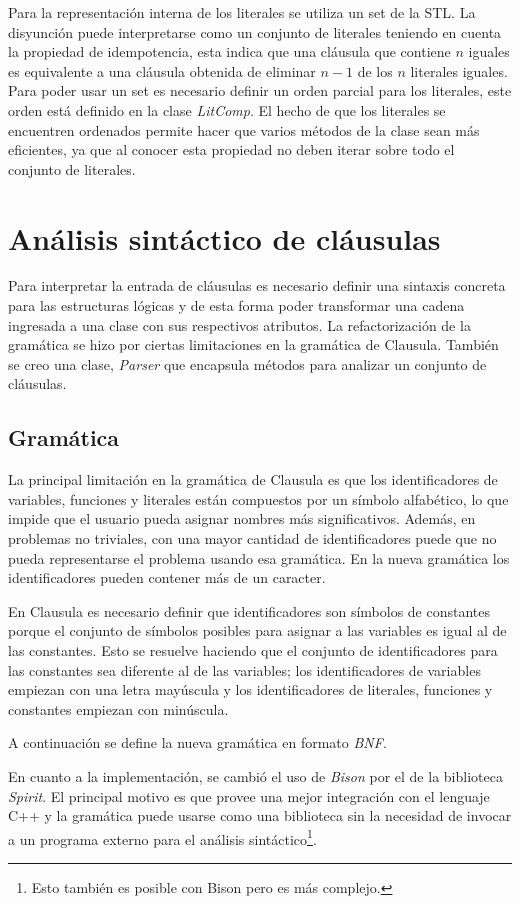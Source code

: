 \documentclass[a4paper,12pt]{article}
\begin{document}
Para la representación interna de los literales se utiliza un set de la STL. La disyunción puede interpretarse como
un conjunto de literales teniendo en cuenta la propiedad de idempotencia, esta indica que una cláusula que contiene
$n$ iguales es equivalente a una cláusula obtenida de eliminar $n-1$ de los $n$ literales iguales. Para poder usar
un set es necesario definir un orden parcial para los literales, este orden está definido en la clase \emph{LitComp}.
El hecho de que los literales se encuentren ordenados permite hacer que varios métodos de la clase sean más eficientes,
ya que al conocer esta propiedad no deben iterar sobre todo el conjunto de literales.
\section{Análisis sintáctico de cláusulas} %
Para interpretar la entrada de cláusulas es necesario definir una sintaxis concreta para las estructuras
lógicas y de esta forma poder transformar una cadena ingresada a una clase con sus respectivos atributos.
La refactorización de la gramática se hizo por ciertas limitaciones en la gramática de Clausula. También
se creo una clase, \emph{Parser} que encapsula métodos para analizar un conjunto de cláusulas.
\subsection{Gramática}
La principal limitación en la gramática de Clausula es que los identificadores de variables, funciones y literales
están compuestos por un símbolo alfabético, lo que impide que el usuario pueda asignar nombres más significativos. Además,
en problemas no triviales, con una mayor cantidad de identificadores puede que no pueda representarse el problema
usando esa gramática. En la nueva gramática los identificadores pueden contener más de un caracter.

En Clausula es necesario definir que identificadores son símbolos de constantes porque el conjunto
de símbolos posibles para asignar a las variables es igual al de las constantes. Esto se resuelve haciendo
que el conjunto de identificadores para las constantes sea diferente al de las variables; los
identificadores de variables empiezan con una letra mayúscula y los identificadores de literales, funciones y constantes
empiezan con minúscula.

A continuación se define la nueva gramática en formato \emph{BNF}.

En cuanto a la implementación, se cambió el uso de \emph{Bison} por el de la biblioteca \emph{Spirit}\cite{spirit}.
El principal motivo es que provee una mejor integración con el lenguaje C++ y la gramática puede usarse como una biblioteca
sin la necesidad de invocar a un programa externo para el análisis sintáctico\footnote{Esto también es posible con Bison pero es más complejo.}.
\end{document}
